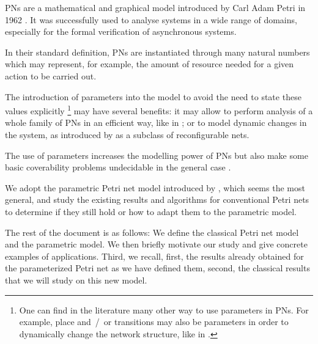 \acp{PN} are a mathematical and graphical model introduced by Carl Adam Petri in 1962 \cite{Petri62}. It was successfully used to analyse systems in a wide range of domains, especially for the formal verification of asynchronous systems.

In their standard definition, \acp{PN} are instantiated through many natural numbers which may represent, for example, the amount of resource needed for a given action to be carried out.

The introduction of parameters into the model to avoid the need to state these values explicitly%
\footnote{One can find in the literature many other way to use parameters in \acp{PN}. For example, place and~/~or transitions may also be parameters in order to dynamically change the network structure, like in \cite{Christensen97}.}
may have several benefits:
it may allow to perform analysis of a whole family of \acp{PN} in an efficient way, like in \cite{Abdulla13}; or to model dynamic changes in the system, as introduced by \cite{Badouel99} as a subclass of reconfigurable nets.

The use of parameters increases the modelling power of \acp{PN} but also make some basic coverability problems undecidable in the general case \cite{David17}.

We adopt the parametric Petri net model introduced by \cite{David17}, which seems the most general, and study the existing results and algorithms for conventional Petri nets to determine if they still hold or how to adapt them to the parametric model.

The rest of the document is as follows:
We define the classical Petri net model and the parametric model.
We then briefly motivate our study and give concrete examples of applications.
Third, we recall, first, the results already obtained for the parameterized Petri net as we have defined them, second, the classical results that we will study on this new model.

